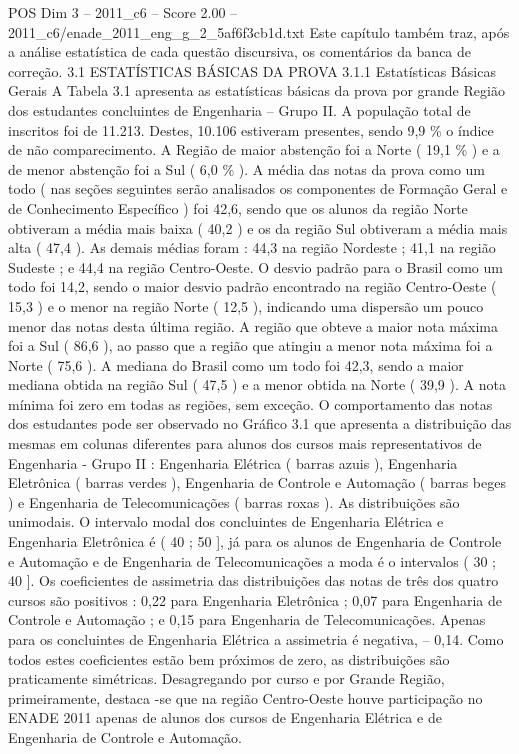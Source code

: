 \begin{textsample}{POS Dim 3 – 2011\_c6 – Score 2.00 – 2011\_c6/enade\_2011\_eng\_g\_2\_5af6f3cb1d.txt}
Este capítulo também traz, após a análise estatística de cada questão discursiva, os comentários da banca de correção. 3.1 ESTATÍSTICAS BÁSICAS DA PROVA 3.1.1 Estatísticas Básicas Gerais A Tabela 3.1 apresenta as estatísticas básicas da prova por grande Região dos estudantes concluintes de Engenharia – Grupo II.
A população total de inscritos foi de 11.213.
Destes, 10.106 estiveram presentes, sendo 9,9 \% o índice de não comparecimento.
A Região de maior abstenção foi a Norte ( 19,1 \% ) e a de menor abstenção foi a Sul ( 6,0 \% ).
A média das notas da prova como um todo ( nas seções seguintes serão analisados os componentes de Formação Geral e de Conhecimento Específico ) foi 42,6, sendo que os alunos da região Norte obtiveram a média mais baixa ( 40,2 ) e os da região Sul obtiveram a média mais alta ( 47,4 ).
As demais médias foram : 44,3 na região Nordeste ; 41,1 na região Sudeste ; e 44,4 na região Centro-Oeste.
O desvio padrão para o Brasil como um todo foi 14,2, sendo o maior desvio padrão encontrado na região Centro-Oeste ( 15,3 ) e o menor na região Norte ( 12,5 ), indicando uma dispersão um pouco menor das notas desta última região.
A região que obteve a maior nota máxima foi a Sul ( 86,6 ), ao passo que a região que atingiu a menor nota máxima foi a Norte ( 75,6 ).
A mediana do Brasil como um todo foi 42,3, sendo a maior mediana obtida na região Sul ( 47,5 ) e a menor obtida na Norte ( 39,9 ).
A nota mínima foi zero em todas as regiões, sem exceção.
O comportamento das notas dos estudantes pode ser observado no Gráfico 3.1 que apresenta a distribuição das mesmas em colunas diferentes para alunos dos cursos mais representativos de Engenharia - Grupo II : Engenharia Elétrica ( barras azuis ), Engenharia Eletrônica ( barras verdes ), Engenharia de Controle e Automação ( barras beges ) e Engenharia de Telecomunicações ( barras roxas ).
As distribuições são unimodais.
O intervalo modal dos concluintes de Engenharia Elétrica e Engenharia Eletrônica é ( 40 ; 50 ], já para os alunos de Engenharia de Controle e Automação e de Engenharia de Telecomunicações a moda é o intervalos ( 30 ; 40 ].
Os coeficientes de assimetria das distribuições das notas de três dos quatro cursos são positivos : 0,22 para Engenharia Eletrônica ; 0,07 para Engenharia de Controle e Automação ; e 0,15 para Engenharia de Telecomunicações.
Apenas para os concluintes de Engenharia Elétrica a assimetria é negativa, – 0,14.
Como todos estes coeficientes estão bem próximos de zero, as distribuições são praticamente simétricas.
Desagregando por curso e por Grande Região, primeiramente, destaca -se que na região Centro-Oeste houve participação no ENADE 2011 apenas de alunos dos cursos de Engenharia Elétrica e de Engenharia de Controle e Automação.

\end{textsample}
